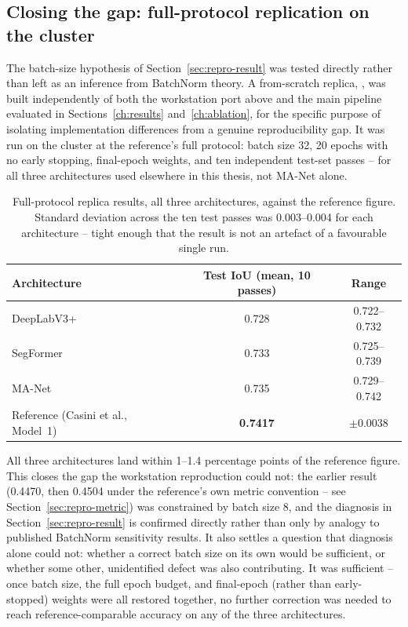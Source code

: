 \subsection{Closing the gap: full-protocol replication on the cluster}
\label{sec:repro-closure}

The batch-size hypothesis of Section~\ref{sec:repro-result} was tested directly
rather than left as an inference from BatchNorm theory. A from-scratch replica,
, was built independently of both the workstation port
above and the main \pads{} pipeline evaluated in Sections~\ref{ch:results}
and~\ref{ch:ablation}, for the specific purpose of isolating implementation
differences from a genuine reproducibility gap. It was run on the cluster at the
reference's full protocol: batch size 32, 20 epochs with no early stopping,
final-epoch weights, and ten independent test-set passes -- for all three
architectures used elsewhere in this thesis, not MA-Net alone.

\begin{table}[!ht]
\centering
\begin{tabular}{lcc}
\toprule
Architecture & Test IoU (mean, 10 passes) & Range \\
\midrule
DeepLabV3+ & 0.728 & 0.722--0.732 \\
SegFormer  & 0.733 & 0.725--0.739 \\
MA-Net     & 0.735 & 0.729--0.742 \\
\midrule
Reference (Casini et al., Model~1) & \textbf{0.7417} & $\pm 0.0038$ \\
\bottomrule
\end{tabular}
\caption[Full-protocol replica results against the reference]{Full-protocol replica results, all three architectures, against the
reference figure. Standard deviation across the ten test passes was 0.003--0.004
for each architecture -- tight enough that the result is not an artefact of a
favourable single run.}
\label{tab:repro-full}
\end{table}

All three architectures land within 1--1.4 percentage points of the reference
figure. This closes the gap the workstation reproduction could not: the earlier
result (0.4470, then 0.4504 under the reference's own metric convention -- see
Section~\ref{sec:repro-metric}) was constrained by batch size 8, and the
diagnosis in Section~\ref{sec:repro-result} is confirmed directly rather than
only by analogy to published BatchNorm sensitivity results. It also settles a
question that diagnosis alone could not: whether a correct batch size on its own
would be sufficient, or whether some other, unidentified defect was also
contributing. It was sufficient -- once batch size, the full epoch budget, and
final-epoch (rather than early-stopped) weights were all restored together, no
further correction was needed to reach reference-comparable accuracy on any of
the three architectures.

